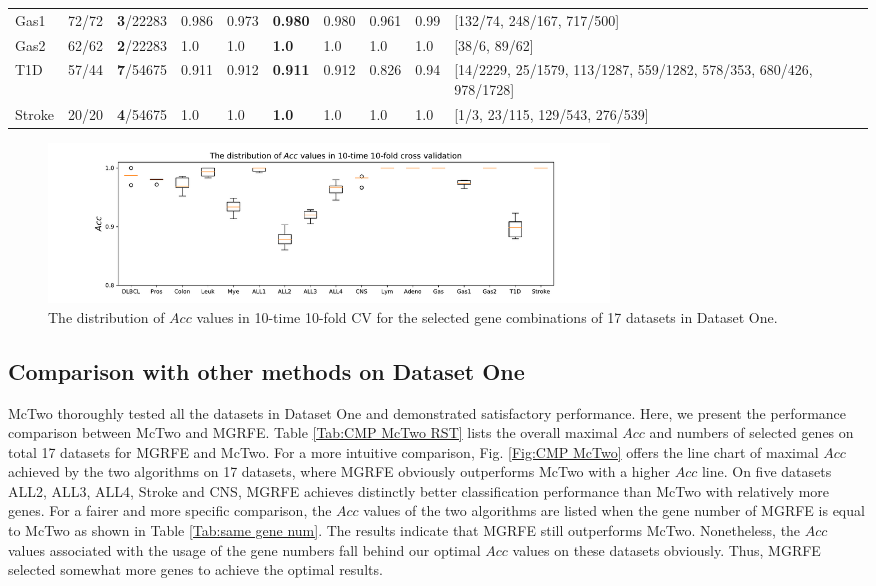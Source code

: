 \documentclass[10pt,journal,compsoc]{IEEEtran}
\begin{document}
\begin{table}[!htbp]
{\begin{tabular}{l|lllllllll}
				Gas1 & 72/72 & \textbf{3}/22283 & 0.986 & 0.973 & \textbf{0.980} & 0.980 & 0.961 & 0.99 & [132/74, 248/167, 717/500]\\
				Gas2 & 62/62 & \textbf{2}/22283 & 1.0 & 1.0 & \textbf{1.0} & 1.0 & 1.0 & 1.0 & [38/6, 89/62]\\
				T1D & 57/44 & \textbf{7}/54675 & 0.911 & 0.912 & \textbf{0.911} & 0.912 & 0.826 & 0.94 & [14/2229, 25/1579, 113/1287, 559/1282, 578/353, 680/426, 978/1728]\\
				Stroke & 20/20 & \textbf{4}/54675 & 1.0 & 1.0 & \textbf{1.0} & 1.0 & 1.0 & 1.0 & [1/3, 23/115, 129/543, 276/539]\\
				\bottomrule
		\end{tabular}}
	\end{table}
	\begin{figure}[htbp]
		\centering
		\includegraphics[width=0.72\textwidth]{pictures/CV1.pdf}
		\caption{The distribution of $Acc$ values in 10-time 10-fold CV for the selected gene combinations of 17 datasets in Dataset One.}
		\label{Fig:CV1}
	\end{figure}
	
	\subsection{Comparison with other methods on Dataset One}
	
	McTwo \cite{W16} thoroughly tested all the datasets in Dataset One and demonstrated satisfactory performance. Here, we present the performance comparison between McTwo and MGRFE. Table \ref{Tab:CMP McTwo RST} lists the overall maximal \(Acc\) and numbers of selected genes on total 17 datasets for MGRFE and McTwo. For a more intuitive comparison, Fig. \ref{Fig:CMP McTwo} offers the line chart of maximal \(Acc\) achieved by the two algorithms on 17 datasets, where MGRFE obviously outperforms McTwo with a higher \(Acc\) line. On five datasets ALL2, ALL3, ALL4, Stroke and CNS, MGRFE achieves distinctly better classification performance than McTwo with relatively more genes. For a fairer and more specific comparison, the \(Acc\) values of the two algorithms are listed when the gene number of MGRFE is equal to McTwo as shown in Table \ref{Tab:same gene num}. The results indicate that MGRFE still outperforms McTwo. Nonetheless, the \(Acc\) values associated with the usage of the gene numbers fall behind our optimal \(Acc\) values on these datasets obviously. Thus, MGRFE selected somewhat more genes to achieve the optimal results.
	
\end{document}
